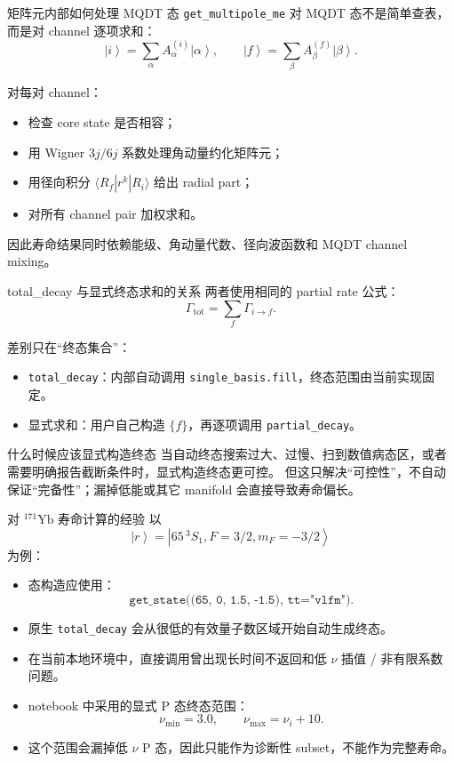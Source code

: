 \documentclass[aspectratio=169,11pt]{ctexbeamer}
\newcommand{\ket}[1]{\left|#1\right\rangle}
\begin{document}
\begin{frame}{矩阵元内部如何处理 MQDT 态}
  \texttt{get\_multipole\_me} 对 MQDT 态不是简单查表，而是对 channel 逐项求和：
  \[
    \ket{i}=\sum_\alpha A_\alpha^{(i)}\ket{\alpha},
    \qquad
    \ket{f}=\sum_\beta A_\beta^{(f)}\ket{\beta}.
  \]

  对每对 channel：
  \begin{itemize}
    \item 检查 core state 是否相容；
    \item 用 Wigner \(3j/6j\) 系数处理角动量约化矩阵元；
    \item 用径向积分 \(\langle R_f|r^k|R_i\rangle\) 给出 radial part；
    \item 对所有 channel pair 加权求和。
  \end{itemize}

  因此寿命结果同时依赖能级、角动量代数、径向波函数和 MQDT channel mixing。
\end{frame}

\begin{frame}{total\_decay 与显式终态求和的关系}
  两者使用相同的 partial rate 公式：
  \[
    \Gamma_{\mathrm{tot}}=\sum_f\Gamma_{i\rightarrow f}.
  \]

  差别只在“终态集合”：
  \begin{itemize}
    \item \texttt{total\_decay}：内部自动调用 \texttt{single\_basis.fill}，终态范围由当前实现固定。
    \item 显式求和：用户自己构造 \(\{f\}\)，再逐项调用 \texttt{partial\_decay}。
  \end{itemize}

  \begin{block}{什么时候应该显式构造终态}
    当自动终态搜索过大、过慢、扫到数值病态区，或者需要明确报告截断条件时，显式构造终态更可控。
    但这只解决“可控性”，不自动保证“完备性”；漏掉低能或其它 manifold 会直接导致寿命偏长。
  \end{block}
\end{frame}

\begin{frame}{对 \({}^{171}\mathrm{Yb}\) 寿命计算的经验}
  以
  \[
    \ket{r}=\ket{65\,{}^3S_1,F=3/2,m_F=-3/2}
  \]
  为例：

  \begin{itemize}
    \item 态构造应使用：
      \[
        \texttt{get\_state((65, 0, 1.5, -1.5), tt="vlfm")}.
      \]
    \item 原生 \texttt{total\_decay} 会从很低的有效量子数区域开始自动生成终态。
    \item 在当前本地环境中，直接调用曾出现长时间不返回和低 \(\nu\) 插值 / 非有限系数问题。
    \item notebook 中采用的显式 P 态终态范围：
      \[
        \nu_{\min}=3.0,\qquad
        \nu_{\max}=\nu_i+10.
      \]
    \item 这个范围会漏掉低 \(\nu\) P 态，因此只能作为诊断性 subset，不能作为完整寿命。
  \end{itemize}
\end{frame}
\end{document}
